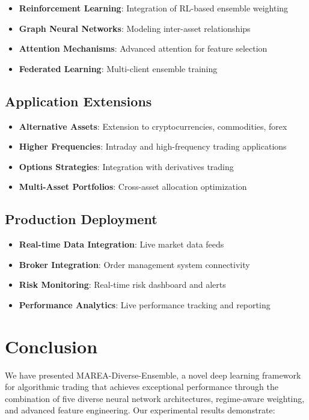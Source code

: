 \documentclass[10pt,twocolumn]{article}
\begin{document}
\begin{itemize}[itemsep=1pt]
\item \textbf{Reinforcement Learning}: Integration of RL-based ensemble weighting
\item \textbf{Graph Neural Networks}: Modeling inter-asset relationships
\item \textbf{Attention Mechanisms}: Advanced attention for feature selection
\item \textbf{Federated Learning}: Multi-client ensemble training
\end{itemize}

\subsection{Application Extensions}

\begin{itemize}[itemsep=1pt]
\item \textbf{Alternative Assets}: Extension to cryptocurrencies, commodities, forex
\item \textbf{Higher Frequencies}: Intraday and high-frequency trading applications
\item \textbf{Options Strategies}: Integration with derivatives trading
\item \textbf{Multi-Asset Portfolios}: Cross-asset allocation optimization
\end{itemize}

\subsection{Production Deployment}

\begin{itemize}[itemsep=1pt]
\item \textbf{Real-time Data Integration}: Live market data feeds
\item \textbf{Broker Integration}: Order management system connectivity
\item \textbf{Risk Monitoring}: Real-time risk dashboard and alerts
\item \textbf{Performance Analytics}: Live performance tracking and reporting
\end{itemize}

\section{Conclusion}

We have presented MAREA-Diverse-Ensemble, a novel deep learning framework for algorithmic trading that achieves exceptional performance through the combination of five diverse neural network architectures, regime-aware weighting, and advanced feature engineering. Our experimental results demonstrate:
\end{document}
